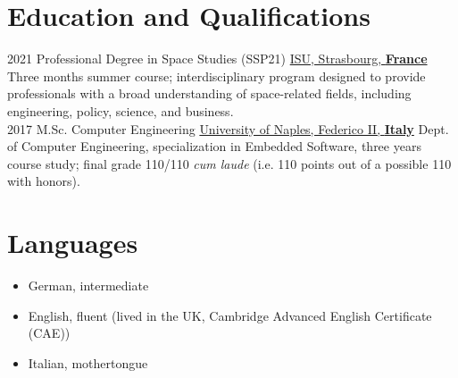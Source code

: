 \documentclass[letterpaper]{twentysecondcv} %
\begin{document}
\section{Education and Qualifications}
\begin{twenty}
	\twentyitem
        {2021}
    	{}
        {Professional Degree in Space Studies (SSP21)}
        {\href{https://www.isunet.edu/ssp/}{ISU, Strasbourg, \textbf{France}}}
        {}
        {
            Three months summer course; interdisciplinary program designed to provide professionals with a broad understanding of space-related fields, including engineering, policy, science, and business.
        }\\
	\twentyitem
        {2017}
    	{}
        {M.Sc. Computer Engineering}
        {\href{http://www.scuolapsb.unina.it/}{University of Naples, Federico II, \textbf{Italy}}}
        {}
        {
            Dept. of Computer Engineering, specialization in Embedded Software, three years course study; final grade 110/110 \textit{cum laude} (i.e. 110 points out of a possible 110 with honors).
        }
\end{twenty}

\section{Languages}

\begin{itemize}
    \item German, intermediate
    \item English, fluent (lived in the UK, Cambridge Advanced English Certificate (CAE))
    \item Italian, mothertongue
\end{itemize}
\end{document}
